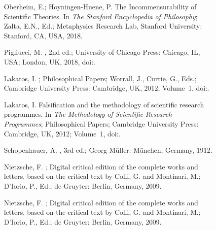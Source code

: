 \documentclass[entropy,article,accept,oneauthor,pdftex]{Definitions/mdpi}
\begin{document}
\begin{figure}[H]
\begin{thebibliography}{999}
Oberheim, E.; Hoyningen-Huene, P.
\newblock The Incommensurability of Scientific Theories. In {\em The {S}tanford
  Encyclopedia of Philosophy};  Zalta, E.N., Ed.; Metaphysics Research Lab, Stanford University: Stanford, CA, USA, 2018.

Pigliucci, M.
, 2nd ed.; University of Chicago Press: Chicago, IL, USA; London, UK,  2018, doi:{\href{https://doi.org/10.7208/chicago/9780226496047.001.0001}{}}. %

Lakatos, I.
; {P}hilosophical Papers; Worrall, J., Currie, G., Eds.; Cambridge University Press: Cambridge, UK, 2012; {V}olume~1, doi:{\href{https://doi.org/10.1017/CBO9780511621123}{}}.%

Lakatos, I.
\newblock Falsification and the methodology of scientific research programmes.
  In {\em The Methodology of Scientific Research Programmes}; {P}hilosophical Papers; Cambridge University Press: Cambridge, UK, 2012; {V}olume~1, doi:{\href{https://doi.org/10.1017/CBO9780511621123.003}{}}.%

Schopenhauer, A.
, 3rd ed.; Georg M\"uller: M\"unchen, Germany, 1912.%

Nietzsche, F.
; Digital critical edition of the complete works and letters, based on
  the critical text by Colli, G. and Montinari, M.; D'Iorio, P., Ed.; de Gruyter: Berlin, Germany, 2009.%

Nietzsche, F.
; Digital critical edition of the complete works and letters, based on the critical text by Colli, G. and Montinari, M.; D'Iorio, P., Ed.; de Gruyter: Berlin, Germany, 2009.%


\end{thebibliography}
\end{figure}
\end{document}
